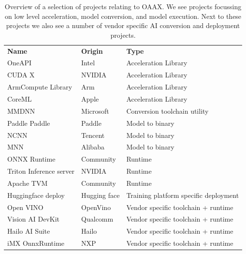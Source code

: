 \documentclass{article}
\begin{document}
\begin{table}[h!tp]
\begin{tabular}{lll}
\textbf{Name}          	 	& \textbf{Origin} & \textbf{Type}                         \\
OneAPI\cite{OneAPI}                  		& Intel           & Acceleration Library                  \\
CUDA X\cite{CUDAX}                 		 & NVIDIA          & Acceleration Library                  \\
ArmCompute Library\cite{ArmCompute}      	& Arm             & Acceleration Library                  \\
CoreML\cite{CoreML}                		 & Apple           & Acceleration Library                  \\
MMDNN\cite{MMdnn}         & Microsoft       & Conversion toolchain utility          \\
Paddle Paddle\cite{PaddlePaddle}           	& Paddle          & Model to binary                       \\
NCNN\cite{NCNN}                    		& Tencent         & Model to binary                       \\
MNN\cite{MNN}                     		& Alibaba         & Model to binary                       \\
ONNX Runtime\cite{ONNXRuntime}            	& Community       & Runtime                               \\
Triton Inference server\cite{Triton} 	& NVIDIA          & Runtime                               \\
Apache TVM\cite{TVM}              	& Community       & Runtime                               \\
Huggingface deploy\cite{Huggingface}      	& Hugging face    & Training platform specific deployment \\
Open VINO\cite{OpenVINO}              		& OpenVino        & Vendor specific toolchain + runtime   \\
Vision AI DevKit\cite{VisionAIDevKit}       		& Qualcomm        & Vendor specific toolchain + runtime   \\
Hailo  AI Suite\cite{Hailo}                 		& Hailo           & Vendor specific toolchain + runtime   \\
iMX OnnxRuntime\cite{iMX}       	& NXP             & Vendor specific toolchain + runtime
\end{tabular}
\caption{Overview of a selection of projects relating to OAAX. We see projects focussing on low level acceleration, model conversion, and model execution. Next to these projects we also see a number of vendor specific AI conversion and deployment projects.}
\label{tab:overview}
\end{table}
\end{document}
